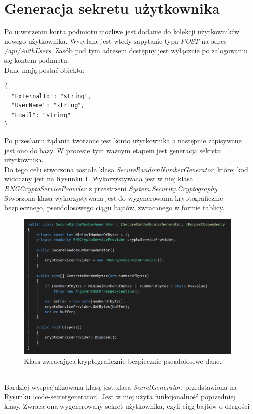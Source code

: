 \section{Generacja sekretu użytkownika}
Po utworzeniu konta podmiotu możliwe jest dodanie do kolekcji użytkowników nowego użytkownika. 
Wysyłane jest wtedy zapytanie typu \textit{POST} na adres \textit{/api/AuthUsers}. Zasób pod tym adresem dostępny jest 
wyłącznie po zalogowaniu się kontem podmiotu. \\
Dane mają postać obiektu:
\begin{lstlisting}
{
  "ExternalId": "string",
  "UserName": "string",
  "Email": "string"
}
\end{lstlisting}
Po przesłaniu żądania tworzone jest konto użytkownika a następnie zapisywane jest ono do bazy. 
W procesie tym ważnym etapem jest generacja sekretu użytkownika. \\ 
Do tego celu stworzona została klasa \textit{SecureRandomNumberGenerator}, której kod widoczny jest na Rysunku \ref{code-srng}.
Wykorzystywana jest w niej klasa \textit{RNGCryptoServiceProvider} z przestrzeni \textit{System.Security.Cryptography}.
Stworzona klasa wykorzystywana jest do wygenerowania kryptograficznie bezpiecznego, pseudolosowego ciągu bajtów, zwracanego 
w formie tablicy.
\begin{figure}[t]
    \centering
	\includegraphics[width=\textwidth]{content/images/code-srng}
    \caption{Klasa zwracająca kryptograficznie bezpiecznie pseudolosowe dane.}
    \label{code-srng}
\end{figure} \\
Bardziej wyspecjalizowaną klasą jest klasa \textit{SecretGenerator}, przedstawiona na Rysunku \ref{code-secretgenerator}.
Jest w niej użyta funkcjonalność poprzedniej klasy. Zwraca ona wygenerowany sekret użytkownika, czyli ciąg bajtów o długości
